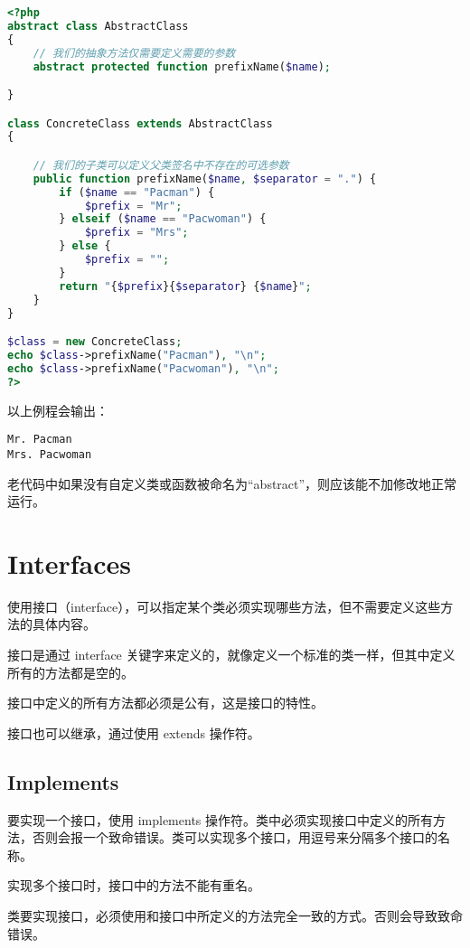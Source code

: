\begin{lstlisting}[language=PHP]
<?php
abstract class AbstractClass
{
    // 我们的抽象方法仅需要定义需要的参数
    abstract protected function prefixName($name);

}

class ConcreteClass extends AbstractClass
{

    // 我们的子类可以定义父类签名中不存在的可选参数
    public function prefixName($name, $separator = ".") {
        if ($name == "Pacman") {
            $prefix = "Mr";
        } elseif ($name == "Pacwoman") {
            $prefix = "Mrs";
        } else {
            $prefix = "";
        }
        return "{$prefix}{$separator} {$name}";
    }
}

$class = new ConcreteClass;
echo $class->prefixName("Pacman"), "\n";
echo $class->prefixName("Pacwoman"), "\n";
?>
\end{lstlisting}


以上例程会输出：

\begin{verbatim}
Mr. Pacman
Mrs. Pacwoman
\end{verbatim}

老代码中如果没有自定义类或函数被命名为“abstract”，则应该能不加修改地正常运行。


\chapter{Interfaces}


使用接口（interface），可以指定某个类必须实现哪些方法，但不需要定义这些方法的具体内容。

接口是通过 interface 关键字来定义的，就像定义一个标准的类一样，但其中定义所有的方法都是空的。

接口中定义的所有方法都必须是公有，这是接口的特性。

接口也可以继承，通过使用 extends 操作符。

\section{Implements}


要实现一个接口，使用 implements 操作符。类中必须实现接口中定义的所有方法，否则会报一个致命错误。类可以实现多个接口，用逗号来分隔多个接口的名称。

实现多个接口时，接口中的方法不能有重名。



类要实现接口，必须使用和接口中所定义的方法完全一致的方式。否则会导致致命错误。





